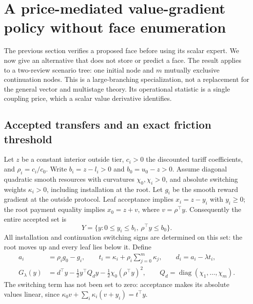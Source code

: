 \section{A price-mediated value-gradient policy without face enumeration}\label{sec:r14-star}
The previous section verifies a proposed face before using its scalar expert. We now give an alternative that does not store or predict a face. The result applies to a two-review scenario tree: one initial node and $m$ mutually exclusive continuation nodes. This is a large-branching specialization, not a replacement for the general vector and multistage theory. Its operational statistic is a single coupling price, which a scalar value derivative identifies.

\subsection{Accepted transfers and an exact friction threshold}
Let $z$ be a constant interior outside tier, $c_i>0$ the discounted tariff coefficients, and $\rho_i=c_i/c_0$. Write $b_i=z-l_i>0$ and $b_0=u_0-z>0$. Assume diagonal quadratic smooth resources with curvatures $\chi_0,\chi_i>0$, and absolute switching weights $\kappa_i>0$, including installation at the root. Let $g_i$ be the smooth reward gradient at the outside protocol. Leaf acceptance implies $x_i=z-y_i$ with $y_i\geq0$; the root payment equality implies $x_0=z+v$, where $v=\rho^\top y$. Consequently the entire accepted set is
\begin{equation}\label{eq:r14-Y}
 Y=\{y:0\leq y_i\leq b_i,\ \rho^\top y\leq b_0\}.
\end{equation}
All installation and continuation switching signs are determined on this set: the root moves up and every leaf lies below it. Define
\begin{equation}\label{eq:r14-objective}
 \begin{split}
 a_i&=\rho_i g_0-g_i,\qquad
 t_i=\kappa_i+\rho_i\sum_{j=0}^m\kappa_j,\qquad d_i=a_i-\lambda t_i,\\
 G_\lambda(y)&=d^\top y-\tfrac12 y^\top Q_dy-\tfrac12\chi_0(\rho^\top y)^2,
 \qquad Q_d=\operatorname{diag}(\chi_1,\ldots,\chi_m).
 \end{split}
\end{equation}
The switching term has not been set to zero: acceptance makes its absolute values linear, since $\kappa_0v+\sum_i\kappa_i(v+y_i)=t^\top y$.

